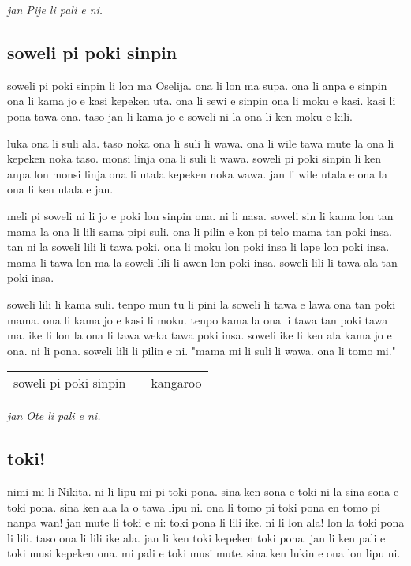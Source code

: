 \textit{jan Pije li pali e ni. \cite{www:Pije:01}}
%
\subsection{soweli pi poki sinpin}

soweli pi poki sinpin li lon ma Oselija.
ona li lon ma supa.
ona li anpa e sinpin ona li kama jo e kasi kepeken uta.
ona li sewi e sinpin ona li moku e kasi.
kasi li pona tawa ona.
taso jan li kama jo e soweli ni la ona li ken moku e kili.

luka ona li suli ala.
taso noka ona li suli li wawa.
ona li wile tawa mute la ona li kepeken noka taso.
monsi linja ona li suli li wawa.
soweli pi poki sinpin li ken anpa lon monsi linja ona li utala kepeken noka wawa.
jan li wile utala e ona la ona li ken utala e jan.

meli pi soweli ni li jo e poki lon sinpin ona.
ni li nasa.
soweli sin li kama lon tan mama la ona li lili sama pipi suli.
ona li pilin e kon pi telo mama tan poki insa.
tan ni la soweli lili li tawa poki.
ona li moku lon poki insa li lape lon poki insa.
mama li tawa lon ma la soweli lili li awen lon poki insa.
soweli lili li tawa ala tan poki insa.

soweli lili li kama suli.
tenpo mun tu li pini la soweli li tawa e lawa ona tan poki mama.
ona li kama jo e kasi li moku.
tenpo kama la ona li tawa tan poki tawa ma.
ike li lon la ona li tawa weka tawa poki insa.
soweli ike li ken ala kama jo e ona.
ni li pona.
soweli lili li pilin e ni.
"mama mi li suli li wawa.
ona li tomo mi."

\begin{supertabular}{p{5,5cm}|ll}
    soweli pi poki sinpin &  & kangaroo \\
\end{supertabular}

\textit{jan Ote li pali e ni. \cite{www:sowelitoki:01}}
%
%
\subsection{toki!}

nimi mi li Nikita. ni li lipu mi pi toki pona. sina ken sona e toki ni la sina sona e toki pona. sina ken ala la o tawa lipu ni. ona li tomo pi toki pona en tomo pi nanpa wan!
jan mute li toki e ni: toki pona li lili ike. ni li lon ala! lon la toki pona li lili. taso ona li lili ike ala. jan li ken toki kepeken toki pona. jan li ken pali e toki musi kepeken ona.
mi pali e toki musi mute. sina ken lukin e ona lon lipu ni.

